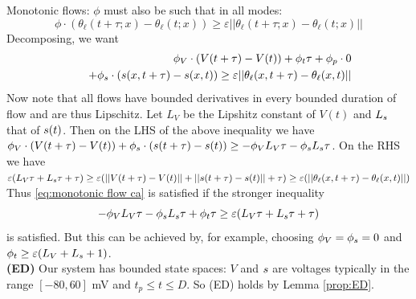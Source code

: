 \begin{prf}
Monotonic flows: $\phi$ must also be such that in all modes:
\begin{equation*}
\phi \cdot (\theta_\ell(t+\tau;x) - \theta_\ell(t;x)) \geq \varepsilon ||\theta_\ell(t+\tau;x) - \theta_\ell(t;x)||
\end{equation*}
Decomposing, we want 
\begin{eqnarray}
\label{eq:monotonic flow ca}
&&\phi_V \cdot(V(t+\tau) - V(t)) + \phi_t \tau + \phi_p \cdot 0 
\\
&&\quad+ \phi_s \cdot (s(x,t+\tau) - s(x,t)) \geq \varepsilon ||\theta_\ell(x,t+\tau) - \theta_\ell(x,t)||
\nonumber 
\end{eqnarray}
Now note that all flows have bounded derivatives in every bounded duration of flow and are thus Lipschitz. 
Let $L_V$ be the Lipshitz constant of $V(t)$ and $L_{s}$ that of $s(t)$.
Then on the LHS of the above inequality we have 
$\phi_V \cdot(V(t+\tau) - V(t)) + \phi_s \cdot(s(t+\tau) - s(t)) \geq -\phi_V L_V \tau  -\phi_s L_{s} \tau$.
On the RHS we have  
$\varepsilon (L_V\tau + L_{s}\tau + \tau) \geq \varepsilon ( ||V(t+\tau) - V(t)|| + ||s(t+\tau) - s(t) ||  + \tau) \geq \varepsilon ( ||\theta_\ell(x,t+\tau) - \theta_\ell(x,t)||)$
Thus \eqref{eq:monotonic flow ca} is satisfied if the stronger inequality 
\[-\phi_V L_V \tau  -\phi_s L_{s} \tau + \phi_t \tau \geq \varepsilon (L_V\tau + L_{s}\tau + \tau) \]
is satisfied.
But this can be achieved by, for example, choosing $\phi_V = \phi_s = 0$ and $\phi_t \geq \varepsilon(L_V+L_{s}+1)$.
\\
\textbf{(ED)} Our system has bounded state spaces: $V$ and $s$ are voltages typically in the range $[-80,60]$ mV and $t_p \leq t \leq D$.
So (ED) holds by Lemma \ref{prop:ED}. 
\end{prf}